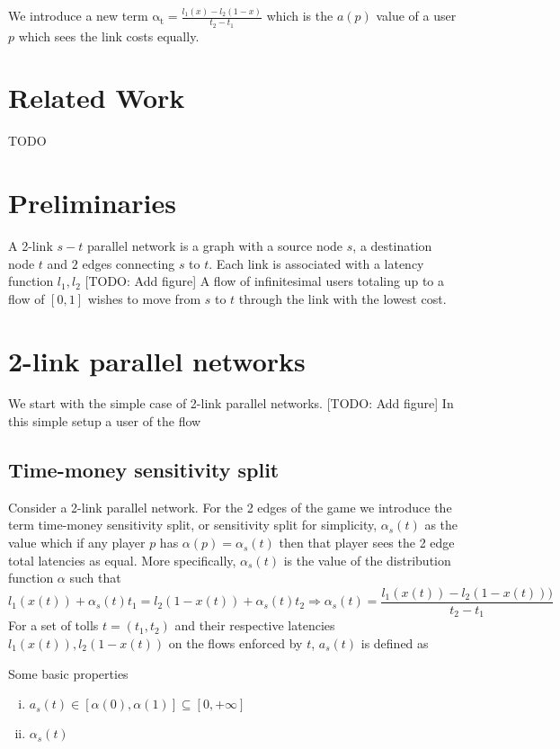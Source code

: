\documentclass[a4paper,11pt]{article}
\newcommand{\at}{\mathrm{\alpha_t}}
\begin{document}
We introduce a new term $\at=\frac{l_1(x)-l_2(1-x)}{t_2-t_1}$ which is the $a(p)$ value of a user $p$ which sees the link costs equally.


\section{Related Work}
TODO


\section{Preliminaries}

A 2-link $s-t$ parallel network is a graph with a source node $s$, a destination node $t$ and $2$ edges connecting $s$ to $t$.
Each link is associated with a latency function $l_1, l_2$
[TODO: Add figure]
A flow of infinitesimal users totaling up to a flow of $[0, 1]$ wishes to move from $s$ to $t$ through the link with the lowest cost.


\section{2-link parallel networks}

We start with the simple case of 2-link parallel networks.
[TODO: Add figure]
In this simple setup a user of the flow 

\subsection{Time-money sensitivity split}

Consider a 2-link parallel network.
For the 2 edges of the game we introduce the term time-money sensitivity split, or sensitivity split for simplicity, $\alpha_s(t)$ as the value which if any player $p$ has $\alpha(p)=\alpha_s(t)$ then that player sees the 2 edge total latencies as equal.
More specifically, $\alpha_s(t)$ is the value of the distribution function $\alpha$ such that
\[l_1(x(t)) + \alpha_s(t) t_1 = l_2(1 - x(t)) + \alpha_s(t) t_2 \Rightarrow \alpha_s(t) = \frac{l_1(x(t)) - l_2(1 - x(t)))}{t_2 - t_1}\]
For a set of tolls $t=(t_1,t_2)$ and their respective latencies $l_1(x(t)), l_2(1-x(t))$ on the flows enforced by $t$, $a_s(t)$ is defined as


Some basic properties
\begin{enumerate}[(i)]
	\item $a_s(t) \in [\alpha(0), \alpha(1)] \subseteq [0, +\infty]$
	\item $\alpha_s(t)$
\end{enumerate}
\end{document}
